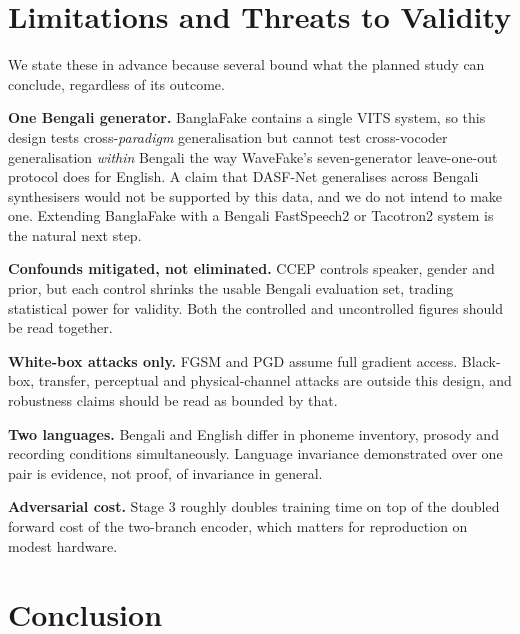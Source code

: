 \documentclass[conference]{IEEEtran}
\begin{document}
\section{Limitations and Threats to Validity}

We state these in advance because several bound what the planned study can
conclude, regardless of its outcome.

\textbf{One Bengali generator.} BanglaFake contains a single VITS system,
so this design tests cross-\emph{paradigm} generalisation but cannot test
cross-vocoder generalisation \emph{within} Bengali the way WaveFake's
seven-generator leave-one-out protocol does for English. A claim that
DASF-Net generalises across Bengali synthesisers would not be supported by
this data, and we do not intend to make one. Extending BanglaFake with a
Bengali FastSpeech2 or Tacotron2 system is the natural next step.

\textbf{Confounds mitigated, not eliminated.} CCEP controls speaker,
gender and prior, but each control shrinks the usable Bengali evaluation
set, trading statistical power for validity. Both the controlled and
uncontrolled figures should be read together.

\textbf{White-box attacks only.} FGSM and PGD assume full gradient access.
Black-box, transfer, perceptual and physical-channel attacks are outside
this design, and robustness claims should be read as bounded by that.

\textbf{Two languages.} Bengali and English differ in phoneme inventory,
prosody and recording conditions simultaneously. Language invariance
demonstrated over one pair is evidence, not proof, of invariance in
general.

\textbf{Adversarial cost.} Stage 3 roughly doubles training time on top of
the doubled forward cost of the two-branch encoder, which matters for
reproduction on modest hardware.

\section{Conclusion}
\end{document}
